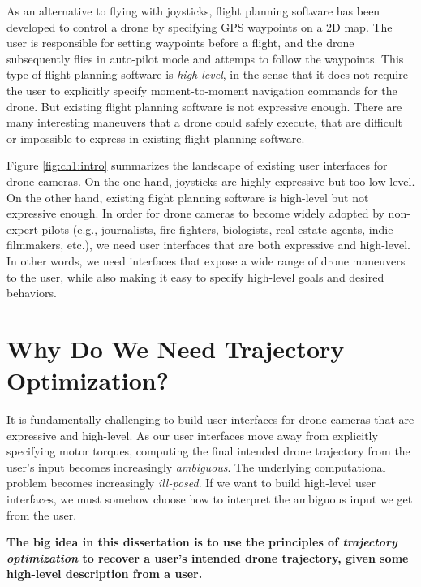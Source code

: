 As an alternative to flying with joysticks, flight planning software has been developed to control a drone by specifying GPS waypoints on a 2D map. 
The user is responsible for setting waypoints before a flight, and the drone subsequently flies in auto-pilot mode and attemps to follow the waypoints.
This type of flight planning software is \emph{high-level}, in the sense that it does not require the user to explicitly specify moment-to-moment navigation commands for the drone.
But existing flight planning software is not expressive enough.
There are many interesting maneuvers that a drone could safely execute, that are difficult or impossible to express in existing flight planning software.

Figure \ref{fig:ch1:intro} summarizes the landscape of existing user interfaces for drone cameras.
On the one hand, joysticks are highly expressive but too low-level.
On the other hand, existing flight planning software is high-level but not expressive enough.
In order for drone cameras to become widely adopted by non-expert pilots (e.g., journalists, fire fighters, biologists, real-estate agents, indie filmmakers, etc.), we need user interfaces that are both expressive and high-level.
In other words, we need interfaces that expose a wide range of drone maneuvers to the user, while also making it easy to specify high-level goals and desired behaviors.

\section{Why Do We Need Trajectory Optimization?}

It is fundamentally challenging to build user interfaces for drone cameras that are expressive and high-level.
As our user interfaces move away from explicitly specifying motor torques, computing the final intended drone trajectory from the user's input becomes increasingly \emph{ambiguous}.
The underlying computational problem becomes increasingly \emph{ill-posed}.
If we want to build high-level user interfaces, we must somehow choose how to interpret the ambiguous input we get from the user.

\begin{tcolorbox}[before skip=20pt, after skip=20pt, sharp corners]
\begin{center}
\textbf{The big idea in this dissertation is to use the principles of \emph{trajectory optimization} to recover a user's intended drone trajectory, given some high-level description from a user.}
\end{center}
\end{tcolorbox}

